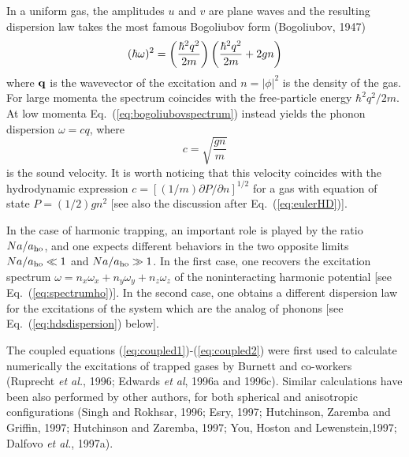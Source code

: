 In a uniform gas, the amplitudes $u$ and $v$ are plane waves and
the resulting dispersion law takes the most famous Bogoliubov form
(Bogoliubov, 1947)
\begin{equation}
(\hbar \omega)^2 = \left( {\hbar ^2 q^2 \over 2m} \right) \left(
{ \hbar^2 q^2 \over 2 m} + 2 g n \right)
\label{eq:bogoliubovspectrum}
\end{equation}
where ${\bf q}$ is the wavevector of the excitation and
$n=|\phi |^2$ is the  density of the gas. For large momenta the spectrum
coincides with the free-particle energy $\hbar^2q^2/2m$.  At low momenta
Eq.~(\ref{eq:bogoliubovspectrum}) instead yields the phonon dispersion
$\omega=cq$, where
\begin{equation}
c = \sqrt{\frac{g n}{m}}
\label{eq:phonons}
\end{equation}
is the sound velocity. It is worth noticing that this velocity coincides 
with the hydrodynamic expression $c= [(1/m) \partial P/\partial n]^{1/2}$ 
for a gas with equation of state $P = (1/2) gn^2$ [see also the discussion 
after Eq.~(\ref{eq:eulerHD})].

In the case of harmonic trapping, an important role is played by the ratio
$Na/a_{\rm ho}$,  and one expects different behaviors in the two opposite
limits $Na/a_{\rm ho} \ll 1$ and $Na/a_{\rm ho} \gg 1$. In the first case, 
one recovers the excitation spectrum   $\omega= n_x \omega_x + n_y \omega_y
+ n_z \omega_z$ of the noninteracting harmonic potential [see
Eq.~(\ref{eq:spectrumho})]. In the second case, one obtains a different
dispersion law for the excitations of the system which are the analog
of phonons [see Eq.~(\ref{eq:hdsdispersion}) below].

The coupled  equations (\ref{eq:coupled1})-(\ref{eq:coupled2}) were
first used to calculate numerically the excitations of trapped gases 
by Burnett and co-workers (Ruprecht {\it et al.}, 1996; 
Edwards {\it et al}, 1996a and 1996c). Similar calculations have been 
also performed by other authors, for both spherical  and anisotropic
configurations (Singh and Rokhsar, 1996; Esry, 1997; Hutchinson, 
Zaremba and Griffin, 1997; Hutchinson and Zaremba, 1997; You, Hoston 
and Lewenstein,1997; Dalfovo {\it et al.}, 1997a).  

